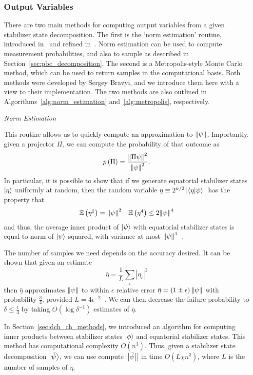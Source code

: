 \subsubsection{Output Variables}
There are two main methods for computing output variables from a given stabilizer state decomposition. The first is the `norm estimation' routine, introduced in~\cite{Bravyi2016} and refined in~\cite{Bravyi2018}. Norm estimation can be used to compute measurement probabilities, and also to sample as described in Section~\ref{sec:pbc_decomposition}. The second is a Metropolis-style Monte Carlo method, which can be used to return samples in the computational basis. Both methods were developed by Sergey Bravyi, and we introduce them here with a view to their implementation. The two methods are also outlined in Algorithms~\ref{alg:norm_estimation} and~\ref{alg:metropolis}, respectively.\par
\large{\itshape{Norm Estimation}}\par
This routine allows us to quickly compute an approximation to $\norm{\psi}$. Importantly, given a projector $\Pi$, we can compute the probability of that outcome as
\begin{equation}
p\left(\Pi\right) = \frac{\norm{\Pi \psi}^{2}}{\norm{\psi}^{2}}.
\end{equation}
In particular, it is possible to show that if we generate equatorial stabilizer states $\ket{\eta}$ uniformly at random, then the random variable $\eta\equiv 2^{n/2}\left|\braket{\eta}{\psi}\right|$ has the property that
\[
\begin{array}{l r}
\mathbb{E}\left(\eta^{2}\right) = \norm{\psi}^{2} & \mathbb{E}\left(\eta^{4}\right) \leq 2\norm{\psi}^{4}
\end{array}
\]
and thus, the average inner product of $\ket{\psi}$ with equatorial stabilizer states is equal to norm of $\ket{\psi}$ squared, with variance at most $\norm{\psi}^{4}$~\cite{Bravyi2018}.\par
The number of samples we need depends on the accuracy desired. It can be shown that given an estimate 
\[\bar{\eta}=\frac{1}{L}\sum_{i}\left|\eta_{i}\right|^{2}\]
then $\bar{\eta}$ approximates $\norm{\psi}$ to within $\epsilon$ relative error $\bar{\eta}=\left(1\pm \epsilon\right)\norm{\psi}$ with probability $\frac{3}{4}$, provided $L=4\epsilon^{-2}$~\cite{Bravyi2018}. We can then decrease the failure probability to $\delta\leq \frac{1}{4}$ by taking $O\left(\log{\delta^{-1}}\right)$ estimates of $\bar{\eta}$.\par
In Section~\ref{sec:dch_ch_methods}, we introduced an algorithm for computing inner products between stabilizer states $\ket{\phi}$ and equatorial stabilizer states. This method has computational complexity $O(n^{3})$. Thus, given a stabilizer state decomposition $\ket{\tilde{\psi}}$, we can use compute $\norm{\tilde{\psi}}$ in time $O(L\chi n^{3})$, where $L$ is the number of samples of $\eta$.\par

